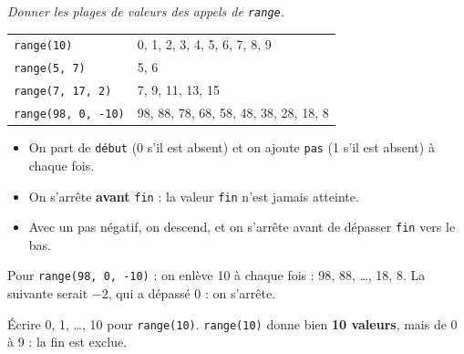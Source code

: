 \documentclass[addpoints, 11pt]{exam}
\newcommand{\enonce}[1]{\textit{#1}\par\smallskip}
\newcommand{\code}[1]{\texttt{#1}}
\DeclareRobustCommand{\_}{\textunderscore\allowbreak}
\begin{document}
\begin{questions}

\question[2] \enonce{Donner les plages de valeurs des appels de \code{range}.}
\begin{reponse}
\begin{tabular}{ll}
\code{range(10)} & 0, 1, 2, 3, 4, 5, 6, 7, 8, 9\\
\code{range(5, 7)} & 5, 6\\
\code{range(7, 17, 2)} & 7, 9, 11, 13, 15\\
\code{range(98, 0, -10)} & 98, 88, 78, 68, 58, 48, 38, 28, 18, 8\\
\end{tabular}
\end{reponse}
\begin{astuce}[À retenir : \code{range(début, fin, pas)}]
\begin{itemize}
  \item On part de \code{début} (0 s'il est absent) et on ajoute \code{pas} (1 s'il est absent) à chaque fois.
  \item On s'arrête \textbf{avant} \code{fin} : la valeur \code{fin} n'est jamais atteinte.
  \item Avec un pas négatif, on descend, et on s'arrête avant de dépasser \code{fin} vers le bas.
\end{itemize}
\end{astuce}
Pour \code{range(98, 0, -10)} : on enlève 10 à chaque fois : 98, 88, \dots, 18, 8. La suivante serait $-2$, qui a dépassé 0 : on s'arrête.

\begin{erreur}
Écrire 0, 1, \dots, 10 pour \code{range(10)}. \code{range(10)} donne bien \textbf{10 valeurs}, mais de 0 à 9 : la fin est exclue.
\end{erreur}


\end{questions}
\end{document}
